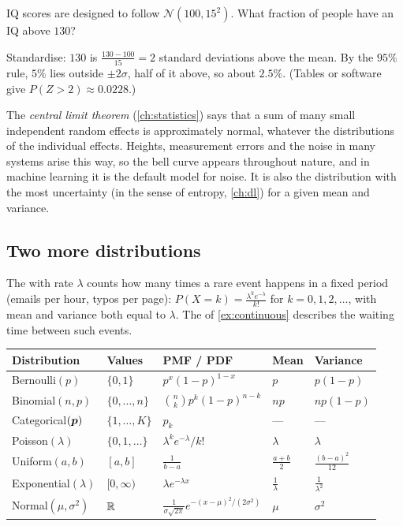\begin{example}
IQ scores are designed to follow $\mathcal{N}(100, 15^2)$. What fraction of
people have an IQ above $130$?

\sol Standardise: $130$ is $\frac{130 - 100}{15} = 2$ standard deviations above
the mean. By the $95\%$ rule, $5\%$ lies outside $\pm2\sigma$, half of it above,
so about $2.5\%$. (Tables or software give $P(Z > 2) \approx 0.0228$.)
\end{example}

\begin{intuition}
The \emph{central limit theorem} (\cref{ch:statistics}) says that a sum of many
small independent random effects is approximately normal, whatever the
distributions of the individual effects. Heights, measurement errors and the
noise in many systems arise this way, so the bell curve appears throughout
nature, and in machine learning it is the default model for noise. It is also
the distribution with the most uncertainty (in the sense of entropy,
\cref{ch:dl}) for a given mean and variance.
\end{intuition}

\subsection{Two more distributions}

The  with rate $\lambda$ counts how many times a rare
event happens in a fixed period (emails per hour, typos per page):
$P(X = k) = \frac{\lambda^ke^{-\lambda}}{k!}$ for $k = 0, 1, 2, \dots$, with mean and
variance both equal to $\lambda$. The  of
\cref{ex:continuous} describes the waiting time between such events.

\begin{center}
\renewcommand{\arraystretch}{1.35}
\begin{tabular}{@{}lllll@{}}
\toprule
\textbf{Distribution} & \textbf{Values} & \textbf{PMF / PDF} & \textbf{Mean} &
  \textbf{Variance}\\
\midrule
Bernoulli$(p)$ & $\{0, 1\}$ & $p^x(1-p)^{1-x}$ & $p$ & $p(1-p)$\\
Binomial$(n, p)$ & $\{0, \dots, n\}$ & $\binom nk p^k(1-p)^{n-k}$ & $np$ & $np(1-p)$\\
Categorical$(\bm{p})$ & $\{1, \dots, K\}$ & $p_k$ & --- & ---\\
Poisson$(\lambda)$ & $\{0, 1, \dots\}$ & $\lambda^ke^{-\lambda}/k!$ & $\lambda$ & $\lambda$\\
Uniform$(a, b)$ & $[a, b]$ & $\frac{1}{b-a}$ & $\frac{a+b}{2}$ & $\frac{(b-a)^2}{12}$\\
Exponential$(\lambda)$ & $[0, \infty)$ & $\lambda e^{-\lambda x}$ & $\frac1\lambda$ & $\frac{1}{\lambda^2}$\\
Normal$(\mu, \sigma^2)$ & $\mathbb{R}$ & $\frac{1}{\sigma\sqrt{2\pi}}e^{-(x-\mu)^2/(2\sigma^2)}$ & $\mu$ & $\sigma^2$\\
\bottomrule
\end{tabular}
\end{center}

